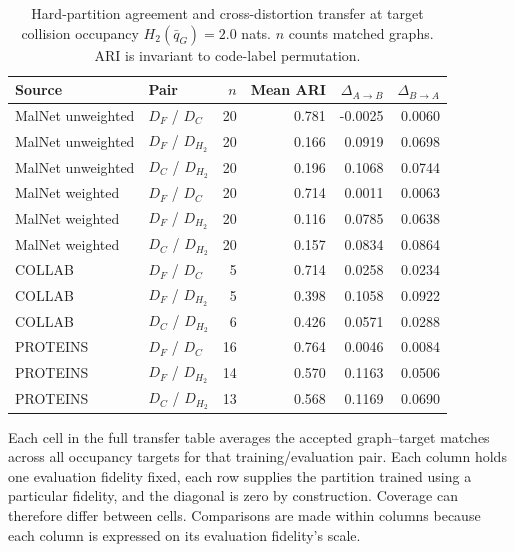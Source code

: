 \begin{table}[htbp]
\centering\small
\setlength{\tabcolsep}{4pt}
\begin{tabular}{llrrrr}
\toprule
Source & Pair & $n$ & Mean ARI & $\Delta_{A\to B}$ & $\Delta_{B\to A}$ \\
\midrule
MalNet unweighted & $D_F$ / $D_C$ & 20 & 0.781 & -0.0025 & 0.0060 \\
MalNet unweighted & $D_F$ / $D_{H_2}$ & 20 & 0.166 & 0.0919 & 0.0698 \\
MalNet unweighted & $D_C$ / $D_{H_2}$ & 20 & 0.196 & 0.1068 & 0.0744 \\
MalNet weighted & $D_F$ / $D_C$ & 20 & 0.714 & 0.0011 & 0.0063 \\
MalNet weighted & $D_F$ / $D_{H_2}$ & 20 & 0.116 & 0.0785 & 0.0638 \\
MalNet weighted & $D_C$ / $D_{H_2}$ & 20 & 0.157 & 0.0834 & 0.0864 \\
COLLAB & $D_F$ / $D_C$ & 5 & 0.714 & 0.0258 & 0.0234 \\
COLLAB & $D_F$ / $D_{H_2}$ & 5 & 0.398 & 0.1058 & 0.0922 \\
COLLAB & $D_C$ / $D_{H_2}$ & 6 & 0.426 & 0.0571 & 0.0288 \\
PROTEINS & $D_F$ / $D_C$ & 16 & 0.764 & 0.0046 & 0.0084 \\
PROTEINS & $D_F$ / $D_{H_2}$ & 14 & 0.570 & 0.1163 & 0.0506 \\
PROTEINS & $D_C$ / $D_{H_2}$ & 13 & 0.568 & 0.1169 & 0.0690 \\
\bottomrule
\end{tabular}
\caption{Hard-partition agreement and cross-distortion transfer at target collision occupancy $H_2(\bar q_G)=2.0$ nats. $n$ counts matched graphs. ARI is invariant to code-label permutation.}
\label{tab:transductive-rate-matched-agreement}
\end{table}

Each cell in the full transfer table averages the accepted graph--target matches across all occupancy targets for that training/evaluation pair.
Each column holds one evaluation fidelity fixed, each row supplies the partition trained using a particular fidelity, and the diagonal is zero by construction.
Coverage can therefore differ between cells.
Comparisons are made within columns because each column is expressed on its evaluation fidelity's scale.

